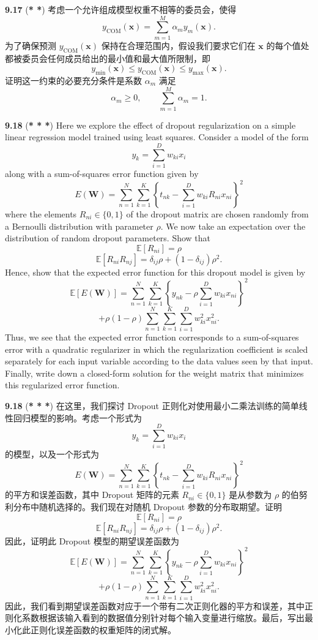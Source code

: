 \documentclass{article}
\begin{document}
\textbf{9.17} (\textbf{* *}) 考虑一个允许组成模型权重不相等的委员会，使得
\[
y_\text{COM}(\mathbf{x}) = \sum_{m=1}^{M} \alpha_m y_m(\mathbf{x}).
\]
为了确保预测 $y_\text{COM}(\mathbf{x})$ 保持在合理范围内，假设我们要求它们在 $\mathbf{x}$ 的每个值处都被委员会任何成员给出的最小值和最大值所限制，即
\[
y_{\min}(\mathbf{x}) \leqslant y_\text{COM}(\mathbf{x}) \leqslant y_{\max}(\mathbf{x}).
\]
证明这一约束的必要充分条件是系数 $\alpha_m$ 满足
\[
\alpha_m \geqslant 0, \qquad \sum_{m=1}^{M} \alpha_m = 1.
\]

\textbf{9.18} (\textbf{* * *}) Here we explore the effect of dropout regularization on a simple linear regression model trained using least squares. Consider a model of the form
\[
y_k = \sum_{i=1}^{D} w_{ki} x_i
\]
along with a sum-of-squares error function given by
\[
E(\mathbf{W}) = \sum_{n=1}^{N} \sum_{k=1}^{K} \left\{ t_{nk} - \sum_{i=1}^{D} w_{ki} R_{ni} x_{ni} \right\}^2
\]
where the elements $R_{ni} \in \{0, 1\}$ of the dropout matrix are chosen randomly from a Bernoulli distribution with parameter $\rho$. We now take an expectation over the distribution of random dropout parameters. Show that
\[
\mathbb{E}[R_{ni}] = \rho
\]
\[
\mathbb{E}[R_{ni} R_{nj}] = \delta_{ij} \rho + (1 - \delta_{ij}) \rho^2.
\]
Hence, show that the expected error function for this dropout model is given by
\[
\mathbb{E}\left[E(\mathbf{W})\right] = \sum_{n=1}^{N} \sum_{k=1}^{K} \left\{ y_{nk} - \rho \sum_{i=1}^{D} w_{ki} x_{ni} \right\}^2
\]
\[
+ \rho(1-\rho) \sum_{n=1}^{N} \sum_{k=1}^{K} \sum_{i=1}^{D} w_{ki}^2 x_{ni}^2.
\]
Thus, we see that the expected error function corresponds to a sum-of-squares error with a quadratic regularizer in which the regularization coefficient is scaled separately for each input variable according to the data values seen by that input. Finally, write down a closed-form solution for the weight matrix that minimizes this regularized error function.

\textbf{9.18} (\textbf{* * *}) 在这里，我们探讨 Dropout 正则化对使用最小二乘法训练的简单线性回归模型的影响。考虑一个形式为
\[
y_k = \sum_{i=1}^{D} w_{ki} x_i
\]
的模型，以及一个形式为
\[
E(\mathbf{W}) = \sum_{n=1}^{N} \sum_{k=1}^{K} \left\{ t_{nk} - \sum_{i=1}^{D} w_{ki} R_{ni} x_{ni} \right\}^2
\]
的平方和误差函数，其中 Dropout 矩阵的元素 $R_{ni} \in \{0, 1\}$ 是从参数为 $\rho$ 的伯努利分布中随机选择的。我们现在对随机 Dropout 参数的分布取期望。证明
\[
\mathbb{E}[R_{ni}] = \rho
\]
\[
\mathbb{E}[R_{ni} R_{nj}] = \delta_{ij} \rho + (1 - \delta_{ij}) \rho^2.
\]
因此，证明此 Dropout 模型的期望误差函数为
\[
\mathbb{E}\left[E(\mathbf{W})\right] = \sum_{n=1}^{N} \sum_{k=1}^{K} \left\{ y_{nk} - \rho \sum_{i=1}^{D} w_{ki} x_{ni} \right\}^2
\]
\[
+ \rho(1-\rho) \sum_{n=1}^{N} \sum_{k=1}^{K} \sum_{i=1}^{D} w_{ki}^2 x_{ni}^2.
\]
因此，我们看到期望误差函数对应于一个带有二次正则化器的平方和误差，其中正则化系数根据该输入看到的数据值分别针对每个输入变量进行缩放。最后，写出最小化此正则化误差函数的权重矩阵的闭式解。
\end{document}
